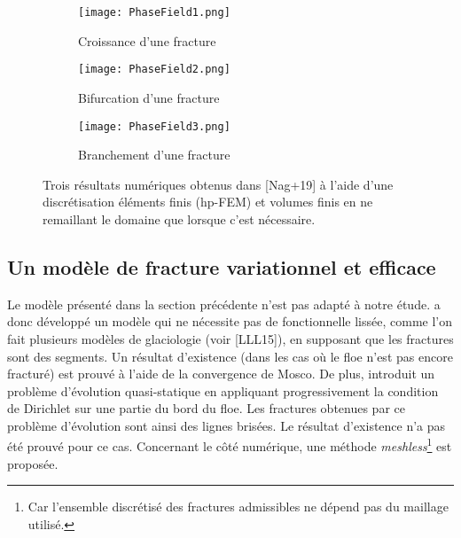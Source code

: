\begin{figure}[!ht]
    \centering
    \begin{subfigure}[b]{0.9\textwidth}
        \centering
        \texttt{[image: PhaseField1.png]} 
        \caption{Croissance d’une fracture}
        \label{fig:PhaseField1}
    \end{subfigure}
    \begin{subfigure}[b]{0.9\textwidth}
        \centering
        \texttt{[image: PhaseField2.png]} 
        \caption{Bifurcation d’une fracture}
        \label{fig:PhaseField2}
    \end{subfigure}
    \begin{subfigure}[b]{0.9\textwidth}
        \centering
        \texttt{[image: PhaseField3.png]} 
        \caption{Branchement d’une fracture}
        \label{fig:PhaseField3}
    \end{subfigure}
       \caption{Trois résultats numériques obtenus dans [Nag+19] à l'aide d'une discrétisation éléments finis (hp-FEM) et volumes finis en ne remaillant le domaine que lorsque c'est nécessaire.}
       \label{fig:PhaseField}
\end{figure}


\subsection{Un modèle de fracture variationnel et efficace} 

Le modèle présenté dans la section précédente n'est pas adapté à notre étude. \citeauthor{balasoiu2020thesis} a donc développé un modèle qui ne nécessite pas de fonctionnelle lissée, comme l'on fait plusieurs modèles de glaciologie (voir [LLL15]), en supposant que les fractures sont des segments. Un résultat d'existence (dans les cas où le floe n'est pas encore fracturé) est prouvé à l'aide de la convergence de Mosco. De plus, \citeauthor{balasoiu2020thesis} introduit un problème d’évolution quasi-statique en appliquant progressivement la condition de Dirichlet sur une partie du bord du floe. Les fractures obtenues par ce problème d’évolution sont ainsi des lignes brisées. Le résultat d'existence n'a pas été prouvé pour ce cas. Concernant le côté numérique, une méthode \textit{meshless}\footnote{Car l’ensemble discrétisé des fractures admissibles ne dépend pas du maillage utilisé.} est proposée.

